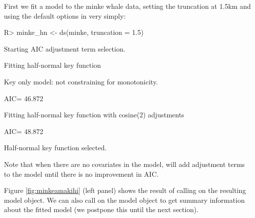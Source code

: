 \documentclass[article]{jss}\usepackage[]{graphicx}\usepackage[]{color}
\begin{document}
First we fit a model to the minke whale data, setting the truncation at 1.5km and using the default options in  very simply:
\begin{Schunk}
\begin{Sinput}
R> minke_hn <- ds(minke, truncation = 1.5)
\end{Sinput}
\begin{Soutput}
Starting AIC adjustment term selection.
\end{Soutput}
\begin{Soutput}
Fitting half-normal key function
\end{Soutput}
\begin{Soutput}
Key only model: not constraining for monotonicity.
\end{Soutput}
\begin{Soutput}
AIC= 46.872
\end{Soutput}
\begin{Soutput}
Fitting half-normal key function with cosine(2) adjustments
\end{Soutput}
\begin{Soutput}
AIC= 48.872
\end{Soutput}
\begin{Soutput}

Half-normal key function selected.
\end{Soutput}
\end{Schunk}
Note that when there are no covariates in the model,  will add adjustment terms to the model until there is no improvement in AIC.

Figure \ref{fig:minkeamakihi} (left panel) shows the result of calling  on the resulting model object. We can also call  on the model object to get summary information about the fitted model (we postpone this until the next section).
\end{document}
